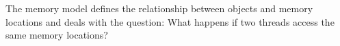 The memory model defines the relationship between objects and memory locations and deals with the question: What happens if two threads access the same memory locations?